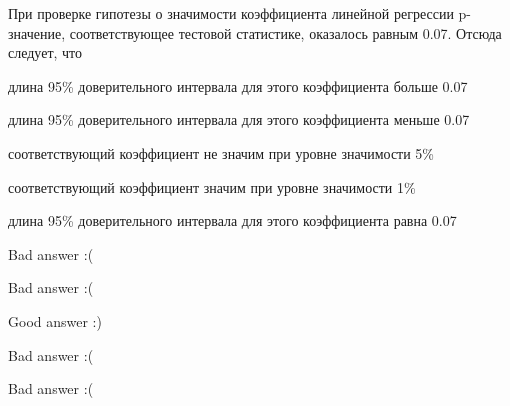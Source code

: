 
\begin{question}
При проверке гипотезы о значимости коэффициента линейной регрессии p-значение, соответствующее тестовой статистике, оказалось равным 0.07. Отсюда следует, что
\begin{answerlist}
  \item длина 95\% доверительного интервала для этого коэффициента больше 0.07
  \item длина 95\% доверительного интервала для этого коэффициента меньше 0.07
  \item соответствующий коэффициент не значим при уровне значимости 5\%
  \item соответствующий коэффициент значим при уровне значимости 1\%
  \item длина 95\% доверительного интервала для этого коэффициента равна 0.07
\end{answerlist}
\end{question}

\begin{solution}
\begin{answerlist}
  \item Bad answer :(
  \item Bad answer :(
  \item Good answer :)
  \item Bad answer :(
  \item Bad answer :(
\end{answerlist}
\end{solution}

